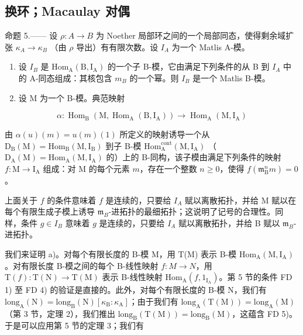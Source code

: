 \subsection{换环；Macaulay 对偶}

命题 5.—— 设 \(\rho: A \to B\) 为 Noether 局部环之间的一个局部同态，使得剩余域扩张 \(\kappa_A \to \kappa_B\) （由 \(\rho\) 导出）有有限次数。设 \(I_A\) 为一个 Matlis A-模。

\begin{enumerate}
\def\labelenumi{\alph{enumi})}
\item
  设 \(I_{B}\) 是 \(\mathrm{Hom}_{\mathrm{A}}(\mathrm{B},\mathrm{I}_{\mathrm{A}})\) 的一个子 B-模，它由满足下列条件的从 B 到 \(I_{A}\) 中的 A-同态组成：其核包含 \(m_{B}\) 的一个幂。则 \(I_{B}\) 是一个 Matlis B-模。
\item
  设 M 为一个 B-模。典范映射
\end{enumerate}

\[
\alpha : \operatorname{Hom} _ {\mathrm{B}} (\mathrm{M}, \operatorname{Hom} _ {\mathrm{A}} (\mathrm{B}, \mathrm{I} _ {\mathrm{A}})) \longrightarrow \operatorname{Hom} _ {\mathrm{A}} (\mathrm{M}, \mathrm{I} _ {\mathrm{A}})
\]

由 \(\alpha(u)(m)=u(m)(1)\) 所定义的映射诱导一个从 \(\mathrm{D}_{\mathrm{B}}(\mathrm{M})=\mathrm{Hom}_{\mathrm{B}}(\mathrm{M},\mathrm{I}_{\mathrm{B}})\) 到子 B-模 \(\mathrm{Hom}_{\mathrm{A}}^{\mathrm{cont}}(\mathrm{M},\mathrm{I}_{\mathrm{A}})\) （\(\mathrm{D}_{\mathrm{A}}(\mathrm{M})=\mathrm{Hom}_{\mathrm{A}}(\mathrm{M},\mathrm{I}_{\mathrm{A}})\) 的）上的 B-同构，该子模由满足下列条件的映射 \(f:\mathrm{M}\to\mathrm{I}_{\mathrm{A}}\) 组成：对 M 的每个元素 \(m\)，存在一个整数 \(n\geqslant0\)，使得 \(f(\mathfrak{m}_{\mathrm{B}}^{n}m)=0\)。

上面关于 \(f\) 的条件意味着 \(f\) 是连续的，只要给 \(I_A\) 赋以离散拓扑，并给 M 赋以在每个有限生成子模上诱导 \(\mathfrak{m}_B\)-进拓扑的最细拓扑；这说明了记号的合理性。同样，条件 \(g \in I_B\) 意味着 \(g\) 是连续的，只要给 \(I_A\) 赋以离散拓扑，并给 B 赋以 \(\mathfrak{m}_B\)-进拓扑。

我们来证明 a)。对每个有限长度的 B-模 M，用 T(M) 表示 B-模 \(\mathrm{Hom}_{\mathrm{A}}(\mathrm{M},\mathrm{I}_{\mathrm{A}})\)。对有限长度 B-模之间的每个 B-线性映射 \(f:M\to N\)，用 \(\mathrm{T}(f):\mathrm{T}(\mathrm{N})\to\mathrm{T}(\mathrm{M})\) 表示 B-线性映射 \(\mathrm{Hom}_{\mathrm{A}}(f,1_{\mathrm{I}_{\mathrm{A}}})\)。第 5 节的条件 FD 1) 至 FD 4) 的验证是直接的。此外，对每个有限长度的 B-模 N，我们有 \(\mathrm{long}_{\mathrm{A}}(\mathrm{N})=\mathrm{long}_{\mathrm{B}}(\mathrm{N})\left[\kappa_{\mathrm{B}}:\kappa_{\mathrm{A}}\right]\)；由于我们有 \(\mathrm{long}_{\mathrm{A}}(\mathrm{T}(\mathrm{M}))=\mathrm{long}_{\mathrm{A}}(\mathrm{M})\)（第 3 节，定理 2），我们推出 \(\mathrm{long}_{\mathrm{B}}(\mathrm{T}(\mathrm{M}))=\mathrm{long}_{\mathrm{B}}(\mathrm{M})\)，这蕴含 FD 5)。于是可以应用第 5 节的定理 3；我们有

